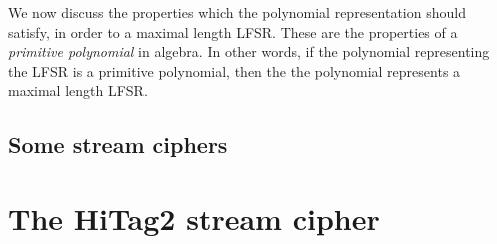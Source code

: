 We now discuss the properties which the polynomial representation should satisfy, in order to  a maximal length LFSR. These are the properties of a \textit{primitive polynomial} in algebra. In other words, if the polynomial representing the LFSR is a primitive polynomial, then the the polynomial represents a maximal length LFSR. 


\subsection{Some stream ciphers}

\section{The HiTag2 stream cipher}
\label{sec:hitag2}



